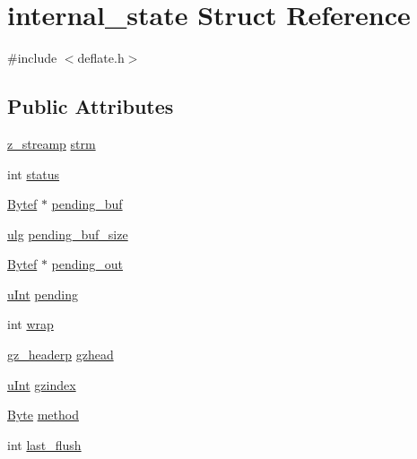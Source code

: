 \hypertarget{structinternal__state}{}\section{internal\+\_\+state Struct Reference}
\label{structinternal__state}


{\ttfamily \#include $<$deflate.\+h$>$}

\subsection*{Public Attributes}
\begin{DoxyCompactItemize}
\item 
\hyperlink{zlib_8h_a6ede25c84d3c9f8632305866acffb1d6}{z\+\_\+streamp} \hyperlink{structinternal__state_aaf558a49ab8c6caea3d131c6b913db42}{strm}
\item 
int \hyperlink{structinternal__state_a8756cacdbac452a2633f87e06fae6c52}{status}
\item 
\hyperlink{zconf_8h_aeb722a888064be47e12d05f692e0f407}{Bytef} $\ast$ \hyperlink{structinternal__state_ae5f393e8d0d569da6038749768f65b94}{pending\+\_\+buf}
\item 
\hyperlink{zutil_8h_abd6f60bf9450af2ecb94097a32c19a64}{ulg} \hyperlink{structinternal__state_a9100ecccf2f8bb474f0bcc7c69f55c27}{pending\+\_\+buf\+\_\+size}
\item 
\hyperlink{zconf_8h_aeb722a888064be47e12d05f692e0f407}{Bytef} $\ast$ \hyperlink{structinternal__state_a6e15ed78675c3c7bdb312623b5eceb7a}{pending\+\_\+out}
\item 
\hyperlink{zconf_8h_a87d141052bcd5ec8a80812a565c70369}{u\+Int} \hyperlink{structinternal__state_ac92f5b70c269be4685539daef10b15a3}{pending}
\item 
int \hyperlink{structinternal__state_ae80327ea7ad4ad0ef5baeef5ef3a6807}{wrap}
\item 
\hyperlink{zlib_8h_a40e9dcc294796d99b25e98fb06477fc8}{gz\+\_\+headerp} \hyperlink{structinternal__state_ac023d0c9e6112dfe6cbd049a56484997}{gzhead}
\item 
\hyperlink{zconf_8h_a87d141052bcd5ec8a80812a565c70369}{u\+Int} \hyperlink{structinternal__state_a5e09188a83aadfcb0db60b0765596aa1}{gzindex}
\item 
\hyperlink{zconf_8h_ae3a497195d617519e5353ea7b417940f}{Byte} \hyperlink{structinternal__state_aeb38f8a255e975e703595577ea43220b}{method}
\item 
int \hyperlink{structinternal__state_aa9517fd4120306e1f07a05563a6fe40b}{last\+\_\+flush}

\end{DoxyCompactItemize}
